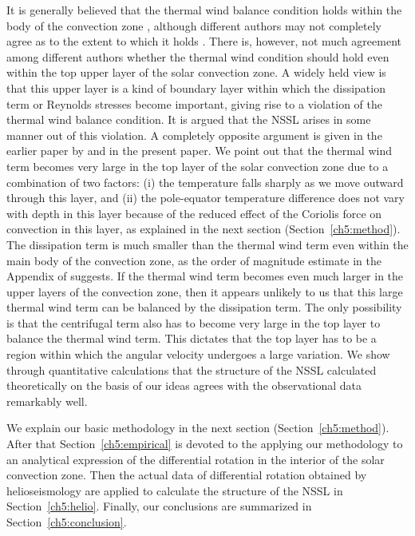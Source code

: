 It is generally believed that the thermal wind balance condition holds within the body of the convection zone
\citep{Kitchatinov2013, Karak2014a}, although different authors may not completely agree as to the extent to which 
it holds  \citep{Brun2010}.  
There is, however, not much agreement among different authors whether the thermal wind condition should
hold even within the top upper layer of the solar convection zone. A widely held view is that this upper
layer is a kind of boundary layer within which the dissipation term or Reynolds stresses become important, giving rise to a
violation of the thermal wind balance condition.  It is argued that the NSSL arises in some manner out of this
violation.  A completely opposite argument is given in the earlier paper by \citet{Choudhuri2021a} and in the
present paper.  We point out that the thermal wind term becomes very large in the top layer of the
solar convection zone due to a combination of two factors: (i) the temperature falls sharply as we move outward
through this layer, and (ii) the pole-equator temperature difference does not vary with depth in this
layer because of the reduced effect of the Coriolis force on convection in this layer, as explained
in the next section (Section~\ref{ch5:method}). The dissipation term is much smaller than the
thermal wind term even within the main body of the convection zone, as the order of magnitude
estimate in the Appendix of \citet{Choudhuri2021a} suggests. If the thermal wind term becomes
even much larger in the upper layers of the convection zone, then it appears unlikely to us that this large thermal wind term
can be balanced by the dissipation term.  The only possibility is that the centrifugal term also
has to become very large in the top layer to balance the thermal wind term.  This dictates that the
top layer has to be a region within which the angular velocity undergoes a large variation.  We show
through quantitative calculations that the structure of the NSSL calculated theoretically on the basis
of our ideas agrees with the observational data remarkably well.

We explain our basic methodology in the next section (Section~\ref{ch5:method}).  After that Section~\ref{ch5:empirical} is devoted to the applying
our methodology to an analytical expression of the differential rotation in the interior of the solar
convection zone.  Then the actual data of differential rotation obtained by helioseismology are applied to
calculate the structure of the NSSL in Section~\ref{ch5:helio}. Finally, our conclusions are summarized in Section~\ref{ch5:conclusion}. 


